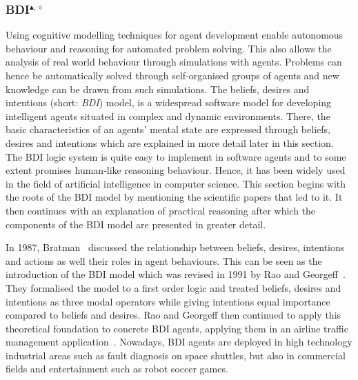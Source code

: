 \subsubsection[BDI]{BDI$^{\blacktriangle,\diamond}$}\label{fun:BDI}
Using cognitive modelling techniques for agent development enable autonomous behaviour and reasoning for automated problem solving.
This also allows the analysis of real world behaviour through simulations with agents.
Problems can hence be automatically solved through self-organised groups of agents and new knowledge can be drawn from such simulations.
The beliefs, desires and intentions (short: \emph{BDI}) model, is a widespread software model for developing intelligent agents situated in complex and dynamic environments.
There, the basic characteristics of an agents' mental state are expressed through beliefs, desires and intentions which are explained in more detail later in this section.
The BDI logic system is quite easy to implement in software agents and to some extent promises human-like reasoning behaviour.
Hence, it has been widely used in the field of artificial intelligence in computer science.
This section begins with the roots of the BDI model by mentioning the scientific papers that led to it.
It then continues with an explanation of practical reasoning after which the components of the BDI model are presented in greater detail.

In 1987, Bratman~\cite{MICHAEL_PlansResource_1988} discussed the relationship between beliefs, desires, intentions and actions as well their roles in agent behaviours.
This can be seen as the introduction of the BDI model which was revised in 1991 by Rao and Georgeff~\cite{rao_modeling_1991}.
They formalised the model to a first order logic and treated beliefs, desires and intentions as three modal operators while giving intentions equal importance compared to beliefs and desires.
Rao and Georgeff then continued to apply this theoretical foundation to concrete BDI agents, applying them in an airline traffic management application~\cite{Rao_BDITheory_1995}.
Nowadays, BDI agents are deployed in high technology industrial areas such as fault diagnosis on space shuttles, but also in commercial fields and entertainment such as robot soccer games.


